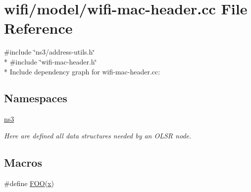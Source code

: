 \hypertarget{wifi-mac-header_8cc}{}\section{wifi/model/wifi-\/mac-\/header.cc File Reference}
\label{wifi-mac-header_8cc}
{\ttfamily \#include \char`\"{}ns3/address-\/utils.\+h\char`\"{}}\\*
{\ttfamily \#include \char`\"{}wifi-\/mac-\/header.\+h\char`\"{}}\\*
Include dependency graph for wifi-\/mac-\/header.cc\+:
\subsection*{Namespaces}
\begin{DoxyCompactItemize}
\item 
 \hyperlink{namespacens3}{ns3}
\begin{DoxyCompactList}\small\item\em Here are defined all data structures needed by an O\+L\+SR node. \end{DoxyCompactList}\end{DoxyCompactItemize}
\subsection*{Macros}
\begin{DoxyCompactItemize}
\item 
\#define \hyperlink{wifi-mac-header_8cc_a528ac17e4c796a1c47ff9631664c51f0}{F\+OO}(\hyperlink{lte__link__budget__x2__handover__measures_8m_a9336ebf25087d91c818ee6e9ec29f8c1}{x})
\end{DoxyCompactItemize}
